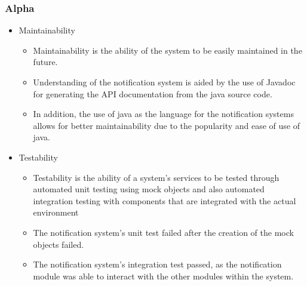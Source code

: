 \subsubsection{Alpha}
\begin{itemize}
	\item Maintainability
		\begin{itemize}
			\item Maintainability is the ability of the system to be easily maintained in the future.
			\item Understanding of the notification system is aided by the use of Javadoc for generating the API documentation from the java source code.
			\item In addition, the use of java as the language for the notification systems allows for better maintainability due to the popularity and ease of use of java.
		\end{itemize}
	\item Testability
		\begin{itemize}
			\item Testability is the ability of a system's services to be tested through automated unit testing using mock objects and also automated integration testing with components that are integrated with the actual environment
			\item The notification system's unit test failed after the creation of the mock objects failed.
			\item The notification system's integration test passed, as the notification module was able to interact with the other modules within the system.
		\end{itemize}
\end{itemize}
